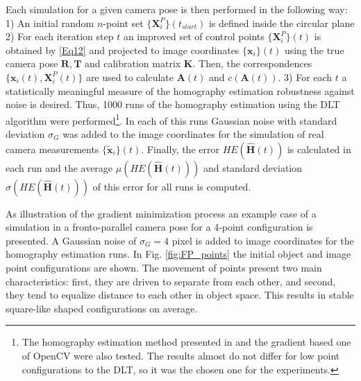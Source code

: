 \documentclass[letterpaper, 10 pt, conference]{ieeeconf}  %
\begin{document}
	Each simulation for a given camera pose is then performed in the following way: 
	1) An initial random $n$-point set $\{\mathbf{X}^P_{i}\}(t_{start})$ is defined inside the circular plane 
	2) For each iteration step $t$ an improved set of control points $\{\mathbf{X}^P_{i}\}(t)$ is obtained by \eqref{Eq12} and projected to image coordinates $\{\mathbf{x}_{i}\}(t)$ using the true camera pose ${\mathbf{R},\mathbf{T}}$ and calibration matrix $\mathbf{K}$. 
	Then, the correspondences $\{\mathbf{x}_{i}(t), \mathbf{X}^P_{i}(t)\}$ are used to calculate $\mathbf{A}(t)$ and $c(\mathbf{A}(t))$. 
	3) For each $t$ a statistically meaningful measure of the homography estimation robustness against noise is desired. Thus, 1000 runs of the homography estimation using the DLT algorithm were performed\footnote{The homography estimation method presented in \cite{Harker2005} and the gradient based one of OpenCV were also tested. The results almost do not differ for low point configurations to the DLT, so it was the chosen one for the experiments.}. In each of this runs Gaussian noise with standard deviation $\sigma_G$ was added to the image coordinates for the simulation of real camera measurements
	$\{\tilde{\mathbf{x}}_{i}\}(t)$. Finally, the error $HE\left(\hat{\mathbf{H}}(t)\right)$ is calculated in each run and the average $\mu\left(HE\left(\hat{\mathbf{H}}(t)\right)\right)$ and standard deviation $\sigma\left(HE\left(\hat{\mathbf{H}}(t)\right)\right)$ of this error for all runs is computed.%
	
	
	As illustration of the gradient minimization process an example case of a simulation in a fronto-parallel camera pose for a 4-point configuration is presented. A Gaussian noise of $\sigma_G=4$ pixel is added to image coordinates for the homography estimation runs. In Fig. \ref{fig:FP_points} the initial object and image point configurations are shown. The movement of points present two main characteristics: first, they are driven to separate from each other, and second, they tend to equalize distance to each other in object space. This results in stable square-like shaped configurations on average.
	
	
\end{document}
